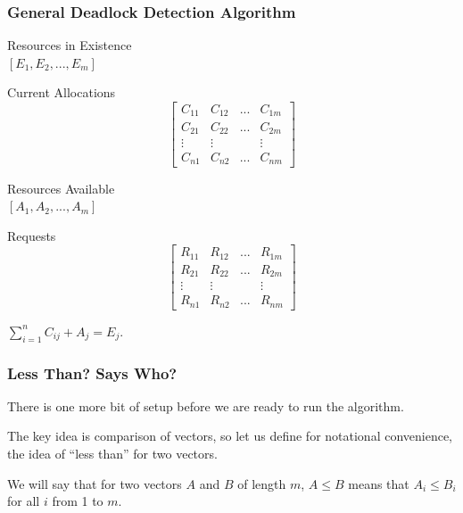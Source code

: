 \begin{frame}
	\frametitle{General Deadlock Detection Algorithm}

	\begin{multicols}{2}
		\begin{center}
			\textsf{Resources in Existence}\\
			$[E_{1}, E_{2}, ..., E_{m}]$\vspace{5em}

			\textsf{Current Allocations}
			\[
				\left[ {\begin{array}{cccc}
								C_{11} & C_{12} & ... & C_{1m} \\
								C_{21} & C_{22} & ... & C_{2m} \\
								\vdots & \vdots &     & \vdots \\
								C_{n1} & C_{n2} & ... & C_{nm}
							\end{array} } \right]
			\]
		\end{center}
		\columnbreak

		\begin{center}
			\textsf{Resources Available}\\
			$[A_{1}, A_{2}, ..., A_{m}]$\vspace{3em}

			\textsf{Requests}
			\[
				\left[ {\begin{array}{cccc}
								R_{11} & R_{12} & ... & R_{1m} \\
								R_{21} & R_{22} & ... & R_{2m} \\
								\vdots & \vdots &     & \vdots \\
								R_{n1} & R_{n2} & ... & R_{nm}
							\end{array} } \right]
			\]
		\end{center}

	\end{multicols}

	\begin{center}
		$\sum\limits_{i=1}^n C_{ij} + A_{j} = E_{j}$.
	\end{center}


\end{frame}

\begin{frame}
	\frametitle{Less Than? Says Who?}

	There is one more bit of setup before we are ready to run the algorithm.

	The key idea is comparison of vectors, so let us define for notational convenience, the idea of ``less than'' for two vectors.

	We will say that for two vectors $A$ and $B$ of length $m$,  $A \leq B$ means that $A_{i} \leq B_{i}$ for all $i$ from 1 to $m$.

\end{frame}

